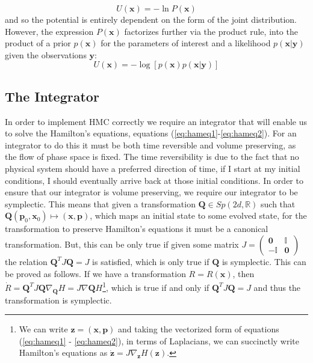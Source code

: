 \begin{equation}
U(\textbf{x}) = -\ln P(\textbf{x})
\end{equation} and so the potential is entirely dependent on the form of the joint distribution. However, the expression $P(\textbf{x})$ factorizes further via the product rule,
into the product of a prior $p(\textbf{x})$ for the parameters of interest and a likelihood $p(\textbf{x}|\textbf{y})$ given the observations $\textbf{y}$: \begin{equation}
U(\textbf{x}) = -\log[p(\textbf{x})p(\textbf{x}|\textbf{y})]
\end{equation}

\subsection{The Integrator}

In order to implement HMC correctly we require an integrator that will enable us to solve the Hamilton's equations, equations (\ref{eq:hameq1}-\ref{eq:hameq2}). For an integrator to do this it must be both time reversible and volume preserving, as the flow of phase space is fixed. The time reversibility is due to the fact that no physical system should have a preferred direction of time, if I start at my initial conditions, I should eventually arrive back at those initial conditions. In order to ensure that our integrator is volume preserving, we require our integrator to be symplectic. This means that given a transformation $\textbf{Q} \in Sp(2d, \mathbb{R})$ such that $\textbf{Q}(\textbf{p}_{0}, \textbf{x}_{0}) \mapsto (\textbf{x}, \textbf{p})$, which maps an initial state to some evolved state, for the transformation to preserve Hamilton's equations it must be a canonical transformation. But, this can be only true if given some matrix $J = \left(\begin{array}{cc} \mathbf{0} & \mathbb{I} \\ -\mathbb{I} & \mathbf{0}\end{array}\right)$ the relation $\textbf{Q}^{T}J\textbf{Q} = J$ is satisfied, which is only true if $\textbf{Q}$ is symplectic. This can be proved as follows. If we have a transformation $R = R(\textbf{x})$, then $\dot{R} = \textbf{Q}^{T}J\textbf{Q}\nabla_{\textbf{Q}}H = J\nabla{\textbf{Q}}H$\footnote{We can write $\textbf{z} = (\textbf{x}, \textbf{p})$ and taking the vectorized form of equations (\ref{eq:hameq1} - \ref{eq:hameq2}), in terms of Laplacians, we can succinctly write Hamilton's equations as $\dot{\textbf{z}} = J\nabla_{\textbf{z}}H(\textbf{z})$. }, which is true if and only if $\textbf{Q}^{T}J\textbf{Q} = J$ and thus the transformation is symplectic.


